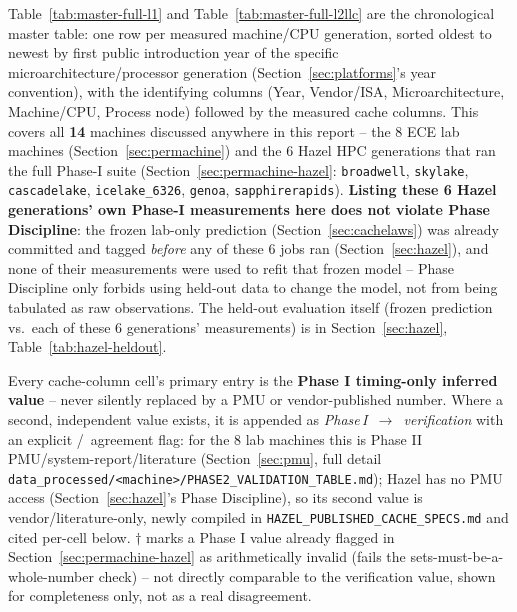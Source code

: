 \documentclass{article}
\newcommand{\cmark}{\ding{51}}
\newcommand{\xmark}{\ding{55}}
\begin{document}
Table~\ref{tab:master-full-l1} and Table~\ref{tab:master-full-l2llc} are the chronological master table: one row per measured machine/CPU generation, sorted
oldest to newest by first public introduction year of the specific
microarchitecture/processor generation (Section~\ref{sec:platforms}'s year convention),
with the identifying columns (Year, Vendor/ISA, Microarchitecture, Machine/CPU,
Process node) followed by the measured cache columns. This covers all \textbf{14} machines
discussed anywhere in this report -- the 8 ECE lab machines (Section~\ref{sec:permachine})
and the 6 Hazel HPC generations that ran the full Phase-I suite
(Section~\ref{sec:permachine-hazel}: \texttt{broadwell}, \texttt{skylake},
\texttt{cascadelake}, \texttt{icelake\_6326}, \texttt{genoa}, \texttt{sapphirerapids}).
\textbf{Listing these 6 Hazel generations' own Phase-I measurements here does not violate
Phase Discipline}: the frozen lab-only prediction (Section~\ref{sec:cachelaws}) was already
committed and tagged \emph{before} any of these 6 jobs ran (Section~\ref{sec:hazel}), and
none of their measurements were used to refit that frozen model -- Phase Discipline only
forbids using held-out data to change the model, not from being tabulated as raw
observations. The held-out evaluation itself (frozen prediction vs.\ each of these 6
generations' measurements) is in Section~\ref{sec:hazel}, Table~\ref{tab:hazel-heldout}.

Every cache-column cell's primary entry is the \textbf{Phase I timing-only inferred value}
-- never silently replaced by a PMU or vendor-published number. Where a second, independent
value exists, it is appended as \emph{Phase\,I~$\to$~verification} with an explicit
\cmark/\xmark\ agreement flag: for the 8 lab machines this is Phase II
PMU/system-report/literature (Section~\ref{sec:pmu}, full detail
\texttt{data\_processed/<machine>/PHASE2\_VALIDATION\_TABLE.md}); Hazel has no PMU access
(Section~\ref{sec:hazel}'s Phase Discipline), so its second value is vendor/literature-only,
newly compiled in \texttt{HAZEL\_PUBLISHED\_CACHE\_SPECS.md} and cited per-cell below.
$\dagger$ marks a Phase I value already flagged in Section~\ref{sec:permachine-hazel} as
arithmetically invalid (fails the sets-must-be-a-whole-number check) -- not directly
comparable to the verification value, shown for completeness only, not as a real
disagreement.
\end{document}
